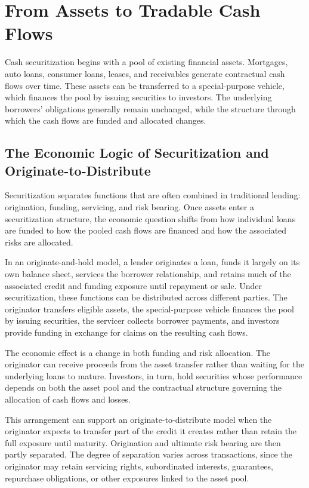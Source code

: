 \section{From Assets to Tradable Cash Flows}

Cash securitization begins with a pool of existing financial assets. Mortgages, auto loans, consumer loans, leases, and receivables generate contractual cash flows over time. These assets can be transferred to a special-purpose vehicle, which finances the pool by issuing securities to investors. The underlying borrowers' obligations generally remain unchanged, while the structure through which the cash flows are funded and allocated changes.

\subsection[The Economic Logic of Securitization and Originate-to-Distribute]{The Economic Logic of Securitization and \\Originate-to-Distribute}

Securitization separates functions that are often combined in traditional lending: origination, funding, servicing, and risk bearing. Once assets enter a securitization structure, the economic question shifts from how individual loans are funded to how the pooled cash flows are financed and how the associated risks are allocated.

In an originate-and-hold model, a lender originates a loan, funds it largely on its own balance sheet, services the borrower relationship, and retains much of the associated credit and funding exposure until repayment or sale. Under securitization, these functions can be distributed across different parties. The originator transfers eligible assets, the special-purpose vehicle finances the pool by issuing securities, the servicer collects borrower payments, and investors provide funding in exchange for claims on the resulting cash flows.

The economic effect is a change in both funding and risk allocation. The originator can receive proceeds from the asset transfer rather than waiting for the underlying loans to mature. Investors, in turn, hold securities whose performance depends on both the asset pool and the contractual structure governing the allocation of cash flows and losses.

This arrangement can support an originate-to-distribute model when the originator expects to transfer part of the credit it creates rather than retain the full exposure until maturity. Origination and ultimate risk bearing are then partly separated. The degree of separation varies across transactions, since the originator may retain servicing rights, subordinated interests, guarantees, repurchase obligations, or other exposures linked to the asset pool.

